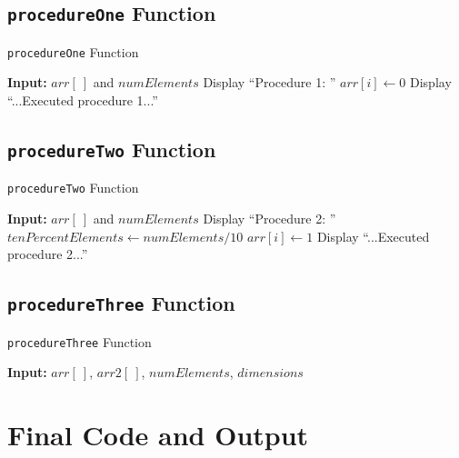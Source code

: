 \documentclass[10pt, conference]{IEEEtran}
\begin{document}
\subsection{\texttt{procedureOne} Function}

\begin{algorithm}[h!]
\caption{\texttt{procedureOne} Function}
\label{procedureOne}
\begin{algorithmic} 

\STATE \textbf{Input:} $arr[\ ]$ and $numElements$
\STATE
\STATE Display ``Procedure 1: ''
	\STATE $arr[i] \leftarrow 0$
\ENDFOR
\STATE Display ``...Executed procedure 1...''

\end{algorithmic}
\end{algorithm}

\subsection{\texttt{procedureTwo} Function}

\begin{algorithm}[h!]
\caption{\texttt{procedureTwo} Function}
\label{procedureTwo}
\begin{algorithmic} 

\STATE \textbf{Input:} $arr[\ ]$ and $numElements$
\STATE
\STATE Display ``Procedure 2: ''
\STATE $tenPercentElements \leftarrow numElements/10$
		\STATE $arr[i] \leftarrow 1$
	\ENDIF
\ENDFOR
\STATE Display ``...Executed procedure 2...''

\end{algorithmic}
\end{algorithm}

\subsection{\texttt{procedureThree} Function}

\begin{algorithm}[h!]
\caption{\texttt{procedureThree} Function}
\label{procedureThree}
\begin{algorithmic} 

\STATE \textbf{Input:} $arr[\ ]$, $arr2[\ ]$, $numElements$, $dimensions$

\end{algorithmic}
\end{algorithm}


\section{Final Code and Output}
\label{Final Code and Output}
\end{document}
